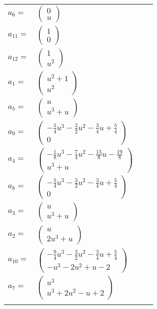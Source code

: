 \documentclass[1p]{elsarticle_modified}
\theoremstyle{definition}
\begin{document}
\begin{tabular}{m{7pt} m{180pt} m{7pt} m{180pt} }
\flushright $a_{6}=$&$\begin{pmatrix}0\\u\end{pmatrix}$ \\
\flushright $a_{11}=$&$\begin{pmatrix}1\\0\end{pmatrix}$ \\
\flushright $a_{12}=$&$\begin{pmatrix}1\\u^2\end{pmatrix}$ \\
\flushright $a_{1}=$&$\begin{pmatrix}u^2+1\\u^2\end{pmatrix}$ \\
\flushright $a_{5}=$&$\begin{pmatrix}u\\u^3+u\end{pmatrix}$ \\
\flushright $a_{9}=$&$\begin{pmatrix}-\frac{5}{4} u^3-\frac{3}{2} u^2-\frac{3}{4} u+\frac{5}{4}\\0\end{pmatrix}$ \\
\flushright $a_{4}=$&$\begin{pmatrix}-\frac{1}{8} u^3-\frac{7}{4} u^2-\frac{15}{8} u-\frac{19}{8}\\u^3+u\end{pmatrix}$ \\
\flushright $a_{8}=$&$\begin{pmatrix}-\frac{5}{4} u^3-\frac{3}{2} u^2-\frac{3}{4} u+\frac{5}{4}\\0\end{pmatrix}$ \\
\flushright $a_{3}=$&$\begin{pmatrix}u\\u^3+u\end{pmatrix}$ \\
\flushright $a_{2}=$&$\begin{pmatrix}u\\2 u^3+u\end{pmatrix}$ \\
\flushright $a_{10}=$&$\begin{pmatrix}-\frac{9}{4} u^3-\frac{3}{2} u^2-\frac{3}{4} u+\frac{5}{4}\\- u^3-2 u^2+u-2\end{pmatrix}$ \\
\flushright $a_{7}=$&$\begin{pmatrix}u^3\\u^3+2 u^2- u+2\end{pmatrix}$\\&\end{tabular}
\end{document}
